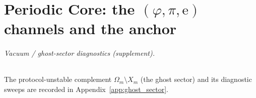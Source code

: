 \part{Periodic Core: the \texorpdfstring{$(\varphi,\pi,\mathrm{e})$}{(phi,pi,e)} channels and the anchor}





\paragraph{Vacuum / ghost-sector diagnostics (supplement).}
\InterfaceTag The protocol-unstable complement $\Omega_m\setminus X_m$ (the ghost sector) and its diagnostic sweeps are recorded in Appendix~\ref{app:ghost_sector}.
